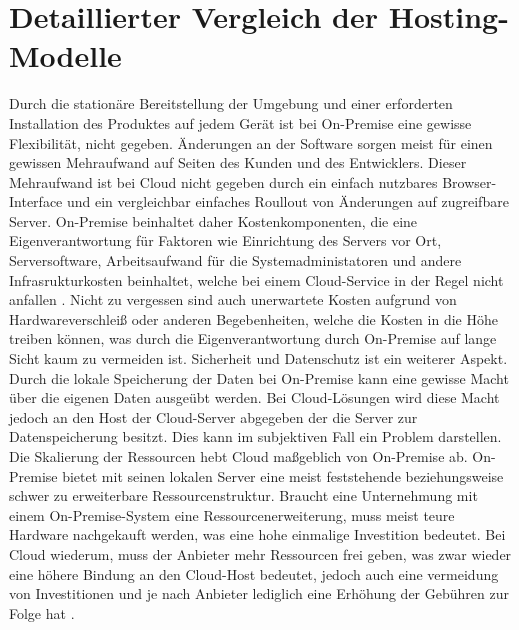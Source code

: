 \documentclass[12pt,bibtotoc]{article}
\begin{document}
	\section{Detaillierter Vergleich der Hosting-Modelle}
			Durch die stationäre Bereitstellung der Umgebung und einer erforderten Installation des Produktes auf jedem Gerät ist bei On-Premise eine gewisse Flexibilität, nicht gegeben.
			Änderungen an der Software sorgen meist für einen gewissen Mehraufwand auf Seiten des Kunden und des Entwicklers. Dieser Mehraufwand ist bei Cloud nicht gegeben durch ein einfach nutzbares Browser-Interface und ein vergleichbar einfaches Roullout von Änderungen auf zugreifbare Server. 
			On-Premise beinhaltet daher Kostenkomponenten, die eine Eigenverantwortung für Faktoren wie Einrichtung des Servers vor Ort, Serversoftware, Arbeitsaufwand für die Systemadministatoren und andere Infrasrukturkosten beinhaltet, welche bei einem Cloud-Service in der Regel nicht anfallen \cite{Fisher.2018}.
			Nicht zu vergessen sind auch unerwartete Kosten aufgrund von Hardwareverschleiß oder anderen Begebenheiten, welche die Kosten in die Höhe treiben können, was durch die Eigenverantwortung durch On-Premise auf lange Sicht kaum zu vermeiden ist.
			\newline
			Sicherheit und Datenschutz ist ein weiterer Aspekt. Durch die lokale Speicherung der Daten bei On-Premise kann eine gewisse Macht über die eigenen Daten ausgeübt werden. 
			Bei Cloud-Lösungen wird diese Macht jedoch an den Host der Cloud-Server abgegeben der die Server zur Datenspeicherung besitzt. Dies kann im subjektiven Fall ein Problem darstellen. 
			\newline
			Die Skalierung der Ressourcen hebt Cloud maßgeblich von On-Premise ab. On-Premise bietet mit seinen lokalen Server eine meist feststehende beziehungsweise schwer zu erweiterbare Ressourcenstruktur. Braucht eine Unternehmung mit einem On-Premise-System eine 
			Ressourcenerweiterung, muss meist teure Hardware nachgekauft werden, was eine hohe einmalige Investition bedeutet.
			Bei Cloud wiederum, muss der Anbieter mehr Ressourcen frei geben, was zwar wieder eine höhere Bindung an den Cloud-Host bedeutet, jedoch auch eine vermeidung von Investitionen und je nach Anbieter lediglich eine Erhöhung der Gebühren zur Folge hat \cite{Murugesan.2016}.
			\newline
\end{document}
